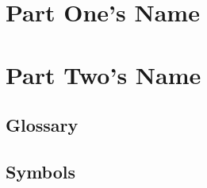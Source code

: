 \documentclass[a4paper,12pt]{book}
\begin{document}
\tableofcontents

\part{Part One's Name}


\part{Part Two's Name}



\appendix
\cleardoublepage
{}
\chapter{Glossary}
\chapter{Symbols}
\end{document}
